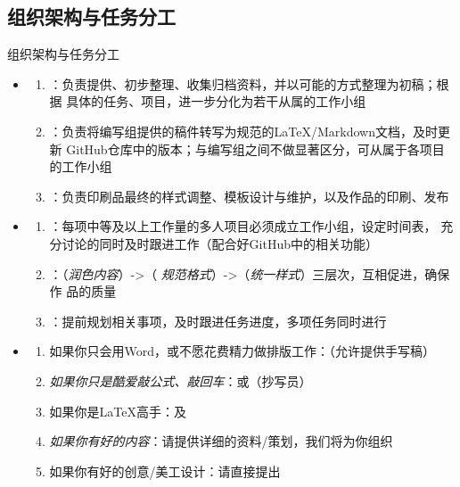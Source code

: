 \documentclass[10pt]{beamer}
\begin{document}
\subsection{组织架构与任务分工}
\begin{frame}{组织架构与任务分工}\footnotesize
\begin{itemize}
    \item {}
    \begin{enumerate}\footnotesize
        \item {}：负责提供、初步整理、收集归档资料，并以可能的方式整理为初稿；根据
        具体的任务、项目，进一步分化为若干从属的工作小组
        \item {}：负责将编写组提供的稿件转写为规范的\LaTeX{}/Markdown文档，及时更新
        GitHub仓库中的版本；与编写组之间不做显著区分，可从属于各项目的工作小组
        \item {}：负责印刷品最终的样式调整、模板设计与维护，以及作品的印刷、发布
    \end{enumerate}
    \item {}
    \begin{enumerate}\footnotesize
        \item {}：每项中等及以上工作量的多人项目必须成立工作小组，设定时间表，
        充分讨论的同时及时跟进工作（配合好GitHub中的相关功能）
        \item {}：（\textit{润色内容}）->（
        \textit{规范格式}）->（\textit{统一样式}）三层次，互相促进，确保作
        品的质量
        \item {}：提前规划相关事项，及时跟进任务进度，多项任务同时进行
    \end{enumerate}
    \item {}
    \begin{enumerate}\footnotesize
        \item {\kaishu 如果你只会用Word，或不愿花费精力做排版工作}：（允许提供手写稿）
        \item \textit{如果你只是酷爱敲公式、敲回车}：或（抄写员）
        \item {\kaishu 如果你是\LaTeX{}高手}：及
        \item \textit{如果你有好的内容}：请提供详细的资料/策划，我们将为你组织
        \item {\kaishu 如果你有好的创意/美工设计}：请直接提出
    \end{enumerate}
\end{itemize}
\end{frame}
\end{document}
